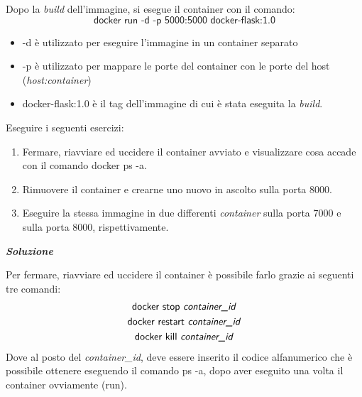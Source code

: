 \documentclass[a4paper]{article}
\begin{document}
	Dopo la \emph{build} dell'immagine, si esegue il container con il comando:
	\begin{equation*}
		\textsf{docker run -d -p 5000:5000 docker-flask:1.0}
	\end{equation*}
	\begin{itemize}
		\item \textsf{-d} è utilizzato per eseguire l'immagine in un container separato
		\item \textsf{-p} è utilizzato per mappare le porte del container con le porte del host (\emph{host:container})
		\item \textsf{docker-flask:1.0} è il tag dell'immagine di cui è stata eseguita la \emph{build}.
	\end{itemize}
	Eseguire i seguenti esercizi:
	\begin{enumerate}
		\item Fermare, riavviare ed uccidere il container avviato e visualizzare cosa accade con il comando \textsf{docker ps -a}.
		
		\item Rimuovere il container e crearne uno nuovo in ascolto sulla porta 8000.
		
		\item Eseguire la stessa immagine in due differenti \emph{container} sulla porta 7000 e sulla porta 8000, rispettivamente.
	\end{enumerate}
	
	\noindent
	\textcolor{Green4}{\textbf{\emph{Soluzione}}}\newline
	
	\noindent
	Per fermare, riavviare ed uccidere il container è possibile farlo grazie ai seguenti tre comandi:
	\begin{gather*}
		\textsf{docker stop \emph{container\_id}} \\
		\textsf{docker restart \emph{container\_id}} \\
		\textsf{docker kill \emph{container\_id}}
	\end{gather*}
	Dove al posto del \emph{container\_id}, deve essere inserito il codice alfanumerico che è possibile ottenere eseguendo il comando \textsf{ps -a}, dopo aver eseguito una volta il container ovviamente (\textsf{run}).\newline
	
\end{document}
